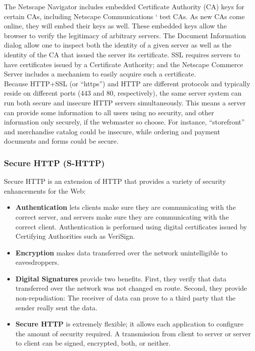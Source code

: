\begin{htmllist}
    The Netscape Navigator includes embedded Certificate Authority (CA)
    keys for certain CAs, including Netscape Communications ` test CAs. As
    new CAs come online, they will embed their keys as well. These embedded
    keys allow the browser to verify the legitimacy of arbitrary servers.
    The Document Information dialog allow one to inspect both the identity
    of a given server as well as the identity of the CA that issued the
    server its certificate. SSL requires servers to have certificates
    issued by a Certificate Authority; and the Netscape Commerce Server
    includes a mechanism to easily acquire such a certificate.\\
    
    Because HTTP+SSL (or ``https'') and HTTP are different protocols and
    typically reside on different ports (443 and 80, respectively), the
    same server system can run both secure and insecure HTTP servers
    simultaneously. This means a server can provide some information to all
    users using no security, and other information only securely, if the
    webmaster so choose. For instance, ``storefront'' and merchandise
    catalog could be insecure, while ordering and payment documents and
    forms could be secure.
\end{htmllist}

\subsubsection{Secure HTTP (S-HTTP)}
Secure HTTP is an extension of HTTP that provides a variety of security
enhancements for the Web:

\begin{itemize}
  \item {\bf Authentication} lets clients make sure they are communicating
    with the correct server, and servers make sure they are communicating
    with the correct client. Authentication is performed using digital
    certificates issued by Certifying Authorities such as VeriSign.
  \item {\bf Encryption} makes data transferred over the network
    unintelligible to eavesdroppers.
  \item {\bf Digital Signatures} provide two benefits. First, they verify
    that data transferred over the network was not changed en route.
    Second, they provide non-repudiation: The receiver of data can prove to
    a third party that the sender really sent the data.
  \item {\bf Secure HTTP} is extremely flexible; it allows each application
    to configure the amount of security required.  A transmission from
    client to server or server to client can be signed, encrypted, both, or
    neither.
\end{itemize}

